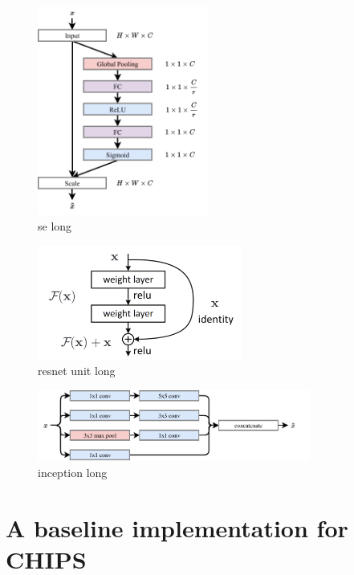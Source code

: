 \begin{figure} %
    \includegraphics[width=0.5\textwidth]{diagrams/7-cvn/se.pdf}
    \caption[se short]
    {se long}
    \label{fig:se}
\end{figure}

\begin{figure} %
    \includegraphics[width=0.6\textwidth]{diagrams/7-cvn/resnet_unit.png}
    \caption[resnet unit short]
    {resnet unit long}
    \label{fig:resnet_unit}
\end{figure}

\begin{figure} %
    \includegraphics[width=0.8\textwidth]{diagrams/7-cvn/inception.pdf}
    \caption[inception short]
    {inception long}
    \label{fig:se}
\end{figure}

\section{A baseline implementation for CHIPS} %
\label{sec:cvn_baseline} %

